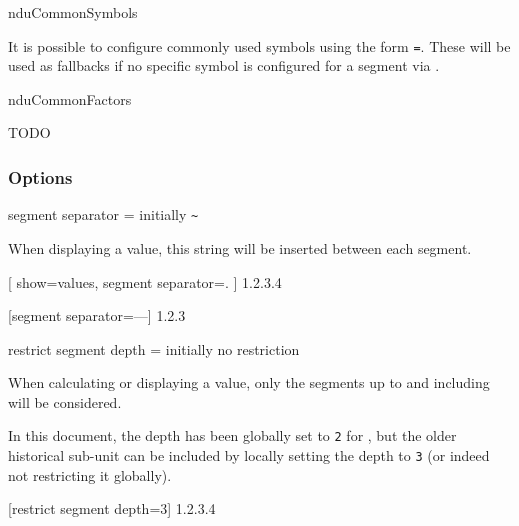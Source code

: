 \documentclass{article}
\begin{document}
\begin{docCommand}
	{nduCommonSymbols}
	{}

	It is possible to configure commonly used symbols using the form \texttt{=}. These will be used as fallbacks if no specific symbol is configured for a segment via .

\end{docCommand}

\begin{docCommand}
	{nduCommonFactors}
	{}

	TODO

\end{docCommand}

\subsubsection{Options}

\begin{docKey}
	{segment separator}
	{=}
	{initially \texttt{\~{}}}
	
	When displaying a value, this string will be inserted between each segment.

\begin{dispExample}
[
		show=values,
		segment separator=.
	]
	{1.2.3.4}

	[segment separator={---}]
	{1.2.3}
\end{dispExample}

\end{docKey}

\begin{docKey}
	{restrict segment depth}
	{=}
	{initially no restriction}
	
	When calculating or displaying a value, only the segments up to and including  will be considered.
	
	In this document, the depth has been globally set to \texttt{2} for , but the older historical sub-unit  can be included by locally setting the depth to \texttt{3} (or indeed not restricting it globally).
	
\begin{dispExample}
	[restrict segment depth=3]
	{1.2.3.4}
\end{dispExample}
\end{docKey}
\end{document}
